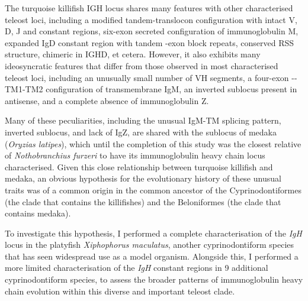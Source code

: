 	The turquoise killifish IGH locus shares many features with other characterised teleost loci, including a modified tandem-translocon configuration with intact V, D, J and constant regions, six-exon secreted configuration of immunoglobulin M, expanded IgD constant region with tandem \cd{}-exon block repeats, conserved RSS structure, chimeric  in IGHD, et cetera. However, it also exhibits many ideosyncratic features that differ from those observed in most characterised teleost loci, including an unusually small number of VH segments, a four-exon --TM1-TM2 configuration of transmembrane IgM, an inverted sublocus present in antisense, and a complete absence of immunoglobulin Z. 
	
	Many of these peculiarities, including the unusual IgM-TM splicing pattern, inverted sublocus, and lack of IgZ, are shared with the sublocus of medaka (\textit{Oryzias latipes}), which until the completion of this study was the closest relative of \textit{Nothobranchius furzeri} to have its immunoglobulin heavy chain locus characterised. Given this close relationship between turquoise killifish and medaka, an obvious hypothesis for the evolutionary history of these unusual traits was of a common origin in the common ancestor of the Cyprinodontiformes (the clade that contains the killifishes) and the Beloniformes (the clade that contains medaka). %

	To investigate this hypothesis, I performed a complete characterisation of the \textit{IgH} locus in the platyfish \textit{Xiphophorus maculatus}, another cyprinodontiform species that has seen widespread use as a model organism. Alongside this, I performed a more limited characterisation of the \textit{IgH} constant regions in 9 %
	additional cyprinodontiform species, to assess the broader patterns of immunoglobulin heavy chain evolution within this diverse and important teleost clade.
	
